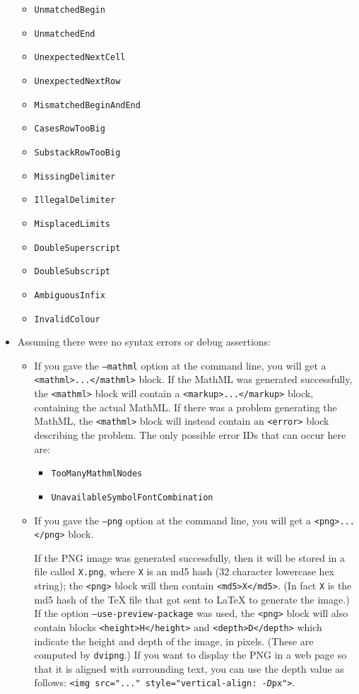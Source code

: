 \documentclass{article}
\begin{document}
\begin{itemize}
\begin{itemize}
\item \texttt{UnmatchedBegin}
\item \texttt{UnmatchedEnd}
\item \texttt{UnexpectedNextCell}
\item \texttt{UnexpectedNextRow}
\item \texttt{MismatchedBeginAndEnd}
\item \texttt{CasesRowTooBig}
\item \texttt{SubstackRowTooBig}
\item \texttt{MissingDelimiter}
\item \texttt{IllegalDelimiter}
\item \texttt{MisplacedLimits}
\item \texttt{DoubleSuperscript}
\item \texttt{DoubleSubscript}
\item \texttt{AmbiguousInfix}
\item \texttt{InvalidColour}
\end{itemize}

\item Assuming there were no syntax errors or debug assertions:

\begin{itemize}

\item If you gave the \texttt{--mathml} option at the command line, you will get a \texttt{<mathml>...</mathml>} block. If the MathML was generated successfully, the \texttt{<mathml>} block will contain a \texttt{<markup>...</markup>} block, containing the actual MathML. If there was a problem generating the MathML, the \texttt{<mathml>} block will instead contain an \texttt{<error>} block describing the problem. The only possible error IDs that can occur here are:
\begin{itemize}
\item \texttt{TooManyMathmlNodes}
\item \texttt{UnavailableSymbolFontCombination}
\end{itemize}

\item If you gave the \texttt{--png} option at the command line, you will get a \texttt{<png>...</png>} block.

If the PNG image was generated successfully, then it will be stored in a file called \texttt{X.png}, where \texttt{X} is an md5 hash (32 character lowercase hex string); the \texttt{<png>} block will then contain \texttt{<md5>X</md5>}. (In fact \texttt{X} is the md5 hash of the \TeX{} file that got sent to \LaTeX{} to generate the image.) If the option \texttt{--use-preview-package} was used, the \texttt{<png>} block will also contain blocks \texttt{<height>H</height>} and \texttt{<depth>D</depth>} which indicate the height and depth of the image, in pixels. (These are computed by \texttt{dvipng}.) If you want to display the PNG in a web page so that it is aligned with surrounding text, you can use the depth value as follows: \texttt{<img src="..." style="vertical-align:~-\textit{D}px">}.


\end{itemize}
\end{itemize}
\end{document}

